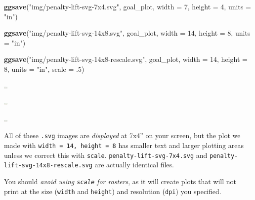 \documentclass[
]{book}
\newenvironment{Shaded}{\begin{snugshade}}{\end{snugshade}}
\newcommand{\AttributeTok}[1]{\textcolor[rgb]{0.13,0.29,0.53}{#1}}
\newcommand{\DecValTok}[1]{\textcolor[rgb]{0.00,0.00,0.81}{#1}}
\newcommand{\FunctionTok}[1]{\textcolor[rgb]{0.13,0.29,0.53}{\textbf{#1}}}
\newcommand{\NormalTok}[1]{#1}
\newcommand{\StringTok}[1]{\textcolor[rgb]{0.31,0.60,0.02}{#1}}
\begin{document}
\begin{Shaded}
\begin{Highlighting}[]
\FunctionTok{ggsave}\NormalTok{(}\StringTok{"img/penalty{-}lift{-}svg{-}7x4.svg"}\NormalTok{, goal\_plot,}
       \AttributeTok{width =} \DecValTok{7}\NormalTok{, }\AttributeTok{height =} \DecValTok{4}\NormalTok{, }\AttributeTok{units =} \StringTok{"in"}\NormalTok{)}

\FunctionTok{ggsave}\NormalTok{(}\StringTok{"img/penalty{-}lift{-}svg{-}14x8.svg"}\NormalTok{, goal\_plot,}
       \AttributeTok{width =} \DecValTok{14}\NormalTok{, }\AttributeTok{height =} \DecValTok{8}\NormalTok{, }\AttributeTok{units =} \StringTok{"in"}\NormalTok{)}

\FunctionTok{ggsave}\NormalTok{(}\StringTok{"img/penalty{-}lift{-}svg{-}14x8{-}rescale.svg"}\NormalTok{, goal\_plot,}
       \AttributeTok{width =} \DecValTok{14}\NormalTok{, }\AttributeTok{height =} \DecValTok{8}\NormalTok{, }\AttributeTok{units =} \StringTok{"in"}\NormalTok{, }\AttributeTok{scale =}\NormalTok{ .}\DecValTok{5}\NormalTok{)}
\end{Highlighting}
\end{Shaded}

\begin{center}\includegraphics[width=7px]{img/penalty-lift-svg-7x4} \end{center}

\begin{center}\includegraphics[width=7px]{img/penalty-lift-svg-14x8} \end{center}

\begin{center}\includegraphics[width=7px]{img/penalty-lift-svg-14x8-rescale} \end{center}

All of these \texttt{.svg} images are \emph{displayed} at 7x4'' on your screen, but the plot we made with \texttt{width\ =\ 14,\ height\ =\ 8} has smaller text and larger plotting areas unless we correct this with \texttt{scale}. \texttt{penalty-lift-svg-7x4.svg} and \texttt{penalty-lift-svg-14x8-rescale.svg} are actually identical files.

You should \emph{avoid using \texttt{scale} for rasters}, as it will create plots that will not print at the size (\texttt{width} and \texttt{height}) and resolution (\texttt{dpi}) you specified.
\end{document}
